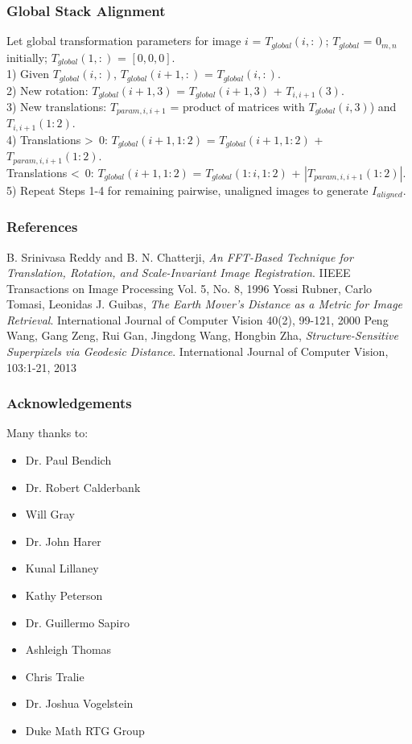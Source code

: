 \documentclass{beamer}
\begin{document}
\begin{frame}
\frametitle{Global Stack Alignment}
	\begin{algorithm}
	\DontPrintSemicolon
	Let global transformation parameters for image $i$ = $T_{global}(i,:)$; $T_{global}$ = $0_{m,n}$ initially; $T_{global}(1,:)$ = $[0, 0, 0]$. \\ 
	1) Given $T_{global}(i,:)$, $T_{global}(i+1,:)$ = $T_{global}(i,:)$. \\
	2) New rotation: $T_{global}(i+1,3)$ = $T_{global}(i+1,3)$ + $T_{i,i+1}(3)$. \\	
	3) New translations: $T_{param,i,i+1}$ = product of matrices with $T_{global}(i,3)$) and $T_{i,i+1}(1:2)$. \\
	4) Translations \textgreater\ 0: $T_{global}(i+1,1:2)$ = $T_{global}(i+1,1:2)$ + $T_{param,i,i+1}(1:2)$. \\
	Translations \textless\ 0: $T_{global}(i+1,1:2)$ = $T_{global}(1:i,1:2)$ + $|T_{param,i,i+1}(1:2)|$. \\
	5) Repeat Steps 1-4 for remaining pairwise, unaligned images to generate $I_{aligned}$. 
	\end{algorithm}
\end{frame}
\begin{frame}
\frametitle{References}
\begin{thebibliography}{9}
	B. Srinivasa Reddy and B. N. Chatterji,
	\emph{An FFT-Based Technique for Translation, Rotation, and Scale-Invariant Image Registration}.
	IIEEE Transactions on Image Processing Vol. 5, No. 8, 1996
	Yossi Rubner, Carlo Tomasi, Leonidas J. Guibas,
	\emph{The Earth Mover's Distance as a Metric for Image Retrieval}.
	International Journal of Computer Vision 40(2), 99-121, 2000
	Peng Wang, Gang Zeng, Rui Gan, Jingdong Wang, Hongbin Zha,
	\emph{Structure-Sensitive Superpixels via Geodesic Distance}.
	International Journal of Computer Vision, 103:1-21, 2013
\end{thebibliography} 
\end{frame}

\begin{frame}
\frametitle{Acknowledgements}
Many thanks to:
\begin{itemize}
\item Dr. Paul Bendich 
\item Dr. Robert Calderbank
\item Will Gray 
\item Dr. John Harer
\item Kunal Lillaney
\item Kathy Peterson 
\item Dr. Guillermo Sapiro
\item Ashleigh Thomas 
\item Chris Tralie
\item Dr. Joshua Vogelstein
\item Duke Math RTG Group 
\end{itemize}
\end{frame}
\end{document}
